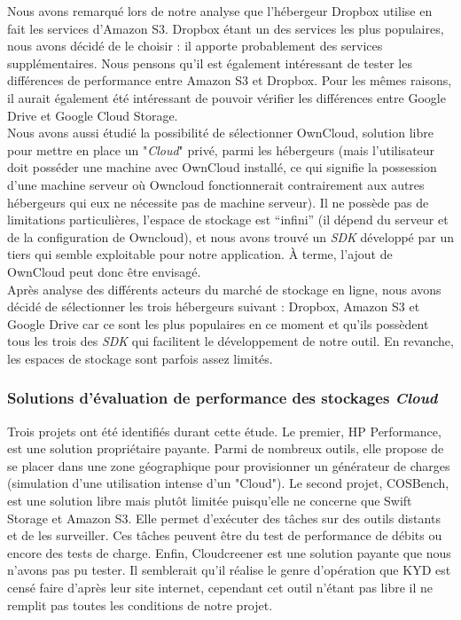 \documentclass[10pt]{article}
\begin{document}
Nous avons remarqué lors de notre analyse que l’hébergeur Dropbox utilise en
fait les services d'Amazon S3. Dropbox étant un des services les plus
populaires, nous avons décidé de le choisir : il apporte probablement des
services supplémentaires. Nous pensons qu’il est également intéressant de
tester les différences de performance entre Amazon S3 et Dropbox. Pour les
mêmes raisons, il aurait également été intéressant de pouvoir vérifier les
différences entre Google Drive et Google Cloud Storage.\\

Nous avons aussi étudié la possibilité de sélectionner OwnCloud, solution libre
pour mettre en place un "\textit{Cloud}" privé, parmi les hébergeurs (mais
l’utilisateur doit posséder une machine avec OwnCloud installé, ce qui signifie
la possession d'une machine serveur où Owncloud fonctionnerait contrairement
aux autres hébergeurs qui eux ne nécessite pas de machine serveur). Il ne
possède pas de limitations particulières, l’espace de stockage est “infini” (il
dépend du serveur et de la configuration de Owncloud), et nous avons trouvé un
\textit{SDK} développé par un tiers qui semble exploitable pour notre
application. À terme, l’ajout de OwnCloud peut donc être envisagé.\\ Après
analyse des différents acteurs du marché de stockage en ligne, nous avons
décidé de sélectionner les trois hébergeurs suivant : Dropbox, Amazon S3 et
Google Drive car ce sont les plus populaires en ce moment et qu'ils possèdent
tous les trois des \textit{SDK} qui facilitent le développement de notre outil.
En revanche, les espaces de stockage sont parfois assez limités.

\subsubsection{Solutions d'évaluation de performance des stockages
\textit{Cloud}}

Trois projets ont été identifiés durant cette étude. Le premier, HP
Performance, est une solution propriétaire payante. Parmi de nombreux outils,
elle propose de se placer dans une zone géographique pour provisionner un
générateur de charges (simulation d'une utilisation intense d'un "Cloud"). Le
second projet, COSBench, est une solution libre mais plutôt limitée puisqu’elle
ne concerne que Swift Storage et Amazon S3. Elle permet d'exécuter des tâches
sur des outils distants et de les surveiller. Ces tâches peuvent être du test
de performance de débits ou encore des tests de charge. Enfin, Cloudcreener est
une solution payante que nous n’avons pas pu tester. Il semblerait qu'il
réalise le genre d'opération que KYD est censé faire d'après leur site
internet, cependant cet outil n'étant pas libre il ne remplit pas toutes les
conditions de notre projet.
\end{document}

